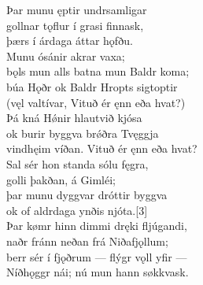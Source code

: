 \bva Þar munu ęptir \hld undrsamligar \\%
gollnar tǫflur \hld í grasi finnask, \\%
þærs í árdaga \hld áttar hǫfðu.\\%

\bva Munu ósánir \hld akrar vaxa; \\%
bǫls mun alls batna \hld mun Baldr koma; \\%
búa Hǫðr ok Baldr \hld Hropts sigtoptir \\%
(vęl valtívar, \hld Vituð ér ęnn eða hvat?)\\%

\bva Þá kná Hǿnir \hld hlautvið kjósa \\%
ok burir byggva \hld brǿðra Tvęggja \\%
vindhęim víðan. \hld Vituð ér ęnn eða hvat?\\%

\bva Sal sér hon standa \hld sólu fęgra, \\%
golli þakðan, \hld á Gimléi; \\%
þar munu dyggvar \hld dróttir byggva \\%
ok of aldrdaga \hld ynðis njóta.[3]\\%

\bva Þar kømr hinn dimmi \hld dręki fljúgandi, \\%
naðr fránn neðan \hld frá Niðafjǫllum; \\%
berr sér í fjǫðrum \hld — flýgr vǫll yfir — \\%
Níðhǫggr nái; \hld nú mun hann søkkvask.
